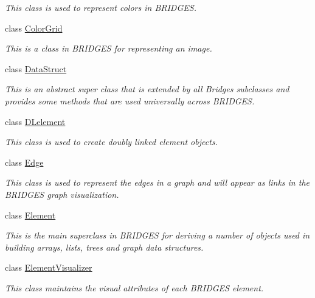 \begin{DoxyCompactItemize}
\begin{DoxyCompactList}\small\item\em This class is used to represent colors in B\+R\+I\+D\+G\+ES. \end{DoxyCompactList}\item 
class \hyperlink{classbridges_1_1base_1_1_color_grid}{Color\+Grid}
\begin{DoxyCompactList}\small\item\em This is a class in B\+R\+I\+D\+G\+ES for representing an image. \end{DoxyCompactList}\item 
class \hyperlink{classbridges_1_1base_1_1_data_struct}{Data\+Struct}
\begin{DoxyCompactList}\small\item\em This is an abstract super class that is extended by all Bridges subclasses and provides some methods that are used universally across B\+R\+I\+D\+G\+ES. \end{DoxyCompactList}\item 
class \hyperlink{classbridges_1_1base_1_1_d_lelement}{D\+Lelement}
\begin{DoxyCompactList}\small\item\em This class is used to create doubly linked element objects. \end{DoxyCompactList}\item 
class \hyperlink{classbridges_1_1base_1_1_edge}{Edge}
\begin{DoxyCompactList}\small\item\em This class is used to represent the edges in a graph and will appear as links in the B\+R\+I\+D\+G\+ES graph visualization. \end{DoxyCompactList}\item 
class \hyperlink{classbridges_1_1base_1_1_element}{Element}
\begin{DoxyCompactList}\small\item\em This is the main superclass in B\+R\+I\+D\+G\+ES for deriving a number of objects used in building arrays, lists, trees and graph data structures. \end{DoxyCompactList}\item 
class \hyperlink{classbridges_1_1base_1_1_element_visualizer}{Element\+Visualizer}
\begin{DoxyCompactList}\small\item\em This class maintains the visual attributes of each B\+R\+I\+D\+G\+ES element. \end{DoxyCompactList}\item 

\end{DoxyCompactItemize}
